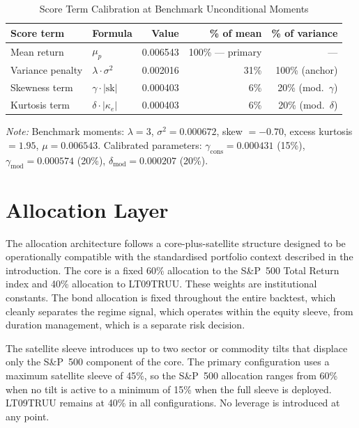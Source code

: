 \documentclass[12pt, a4paper]{article}
\begin{document}
\begin{table}[H]
\centering
\caption{Score Term Calibration at Benchmark Unconditional Moments}
\label{tab:calibration}
\setlength{\tabcolsep}{6pt}
\small
\begin{tabular}{llrrr}
\toprule
\textbf{Score term} & \textbf{Formula} & \textbf{Value}
  & \textbf{\% of mean} & \textbf{\% of variance} \\
\midrule
Mean return      & $\mu_p$                   & 0.006543 & 100\% --- primary & ---  \\
Variance penalty & $\lambda \cdot \sigma^2$  & 0.002016 & 31\%              & 100\% (anchor) \\
Skewness term    & $\gamma \cdot |\text{sk}|$& 0.000403 & 6\%               & 20\% (mod.\ $\gamma$) \\
Kurtosis term    & $\delta \cdot |\kappa_e|$ & 0.000403 & 6\%               & 20\% (mod.\ $\delta$) \\
\bottomrule
\end{tabular}
\begin{minipage}{\linewidth}
\vspace{4pt}\footnotesize
\textit{Note:} Benchmark moments: $\lambda=3$, $\sigma^2=0.000672$, skew $= -0.70$,
excess kurtosis $= 1.95$, $\mu = 0.006543$. Calibrated parameters:
$\gamma_{\text{cons}} = 0.000431$ (15\%), $\gamma_{\text{mod}} = 0.000574$ (20\%),
$\delta_{\text{mod}} = 0.000207$ (20\%).
\end{minipage}
\end{table}

\clearpage
\clearpage
\section{Allocation Layer}
\label{sec:allocation}

The allocation architecture follows a core-plus-satellite structure designed to be
operationally compatible with the standardised portfolio context described in the
introduction. The core is a fixed 60\% allocation to the S\&P~500 Total Return index and
40\% allocation to LT09TRUU. These weights are institutional constants. The bond allocation
is fixed throughout the entire backtest, which cleanly separates the regime signal, which
operates within the equity sleeve, from duration management, which is a separate risk
decision.

The satellite sleeve introduces up to two sector or commodity tilts that displace only the S\&P~500 component of the core. The primary configuration uses a maximum satellite sleeve of 45\%, so the S\&P~500 allocation ranges from 60\% when no tilt is active to a minimum of 15\% when the full sleeve is deployed. LT09TRUU remains at 40\% in all configurations. No leverage is introduced at
any point.
\end{document}
